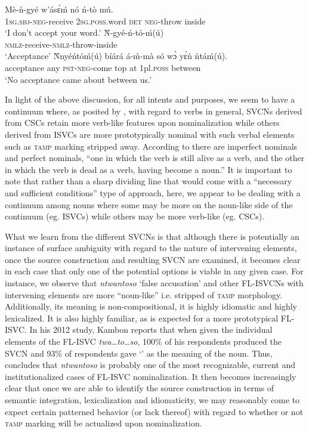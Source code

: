 \documentclass[output=paper,modfonts,nonflat,colorlinks, citecolor=brown, hidelinks]{langsci/langscibook}
\begin{document}
\ea\label{ex:duah:21}
\ea\label{ex:duah:21a}
\gll Mè-ǹ-gyé w’ásɛ́ḿ nó ń-tò mú.\\
1\textsc{sg}.\textsc{sbj}-\textsc{neg}-receive	2\textsc{sg}.\textsc{poss}.word \textsc{det}	\textsc{neg}-throw inside\\
\glt `I don’t accept your word.'
\ex\label{ex:duah:21b}
\gll Ǹ-gyé-ń-tó-ḿ(ú)\\
\textsc{nmlz}-receive-\textsc{nmlz}-throw-inside\\
\glt `Acceptance'
\ex\label{ex:duah:21c}
\gll Ǹnyéńtóḿ(ú)	bíárá á-m̀-mà só wɔ̀ yɛ̀ǹ ǹtáḿ(ú).\\
acceptance any \textsc{pst}-\textsc{neg}-come top at 1pl.\textsc{poss} between\\
\glt `No acceptance came about between us.'
\z
\z

In light of the above discussion, for all intents and purposes, we seem to have a continuum where, as posited by \citet{vendler1967}, with regard to verbs in general, SVCNs derived from CSCs retain more verb-like features upon nominalization while others derived from ISVCs are more prototypically nominal with such verbal elements such as \textsc{tamp} marking stripped away. According to \citet[131]{vendler1967} there are {imperfect nominals} and {perfect nominals}, “one in which the verb is still alive as a verb, and the other in which the verb is dead as a verb, having become a noun.” It is important to note that rather than a sharp dividing line that would come with a “necessary and sufficient conditions” type of approach, here, we appear to be dealing with a continuum among nouns where some may be more on the noun-like side of the continuum (eg. ISVCs) while others may be more verb-like (eg. CSCs). 

What we learn from the different SVCNs is that although there is potentially an instance of surface ambiguity with regard to the nature of intervening elements, once the source construction and resulting SVCN are examined, it becomes clear in each case that only one of the potential options is viable in any given case. For instance, we observe that \textit{ntwantoso} ‘{false accusation}’ and other FL-ISVCNs with intervening elements are more “noun-like” i.e. stripped of \textsc{tamp} morphology. Additionally, its meaning is non-compositional, it is highly idiomatic and highly lexicalized. It is also highly familiar, as is expected for a more prototypical FL-ISVC. In his 2012 study, Kambon reports that when given the individual elements of the FL-ISVC \textit{twa…to…so}, 100\% of his respondents produced the SVCN and 93\% of respondents gave ‘’ as the meaning of the noun. Thus, \citet{kambon2012} concludes that \textit{ntwantoso} is probably one of the most recognizable, current and institutionalized cases of FL-ISVC nominalization. It then becomes increasingly clear that once we are able to identify the source construction in terms of semantic integration, lexicalization and idiomaticity, we may reasonably come to expect certain patterned behavior (or lack thereof) with regard to whether or not \textsc{tamp} marking will be actualized upon nominalization. 
\end{document}

